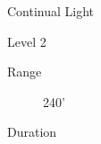 \documentclass{article}
\begin{document}
\flushleft\unclfamily{}

{\Huge Continual Light}

Level 2

\begin{description}
\item[Range] 240'
\item[Duration] 
\end{description}

\lipsum[2-3]
\end{document}
